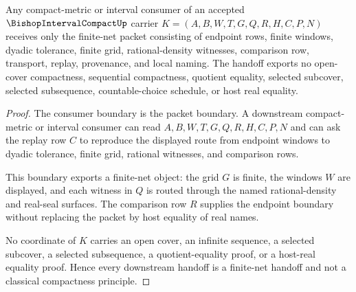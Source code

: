 \begin{theorem}
\label{thm:bishop-interval-compact-compact-metric-handoff}
Any compact-metric or interval consumer of an accepted $\BishopIntervalCompactUp$ carrier $K=(A,B,W,T,G,Q,R,H,C,P,N)$ receives only the finite-net packet consisting of endpoint rows, finite windows, dyadic tolerance, finite grid, rational-density witnesses, comparison row, transport, replay, provenance, and local naming. The handoff exports no open-cover compactness, sequential compactness, quotient equality, selected subcover, selected subsequence, countable-choice schedule, or host real equality.
\end{theorem}
\begin{proof}
The consumer boundary is the packet boundary. A downstream compact-metric or interval consumer can read $A,B,W,T,G,Q,R,H,C,P,N$ and can ask the replay row $C$ to reproduce the displayed route from endpoint windows to dyadic tolerance, finite grid, rational witnesses, and comparison rows.

This boundary exports a finite-net object: the grid $G$ is finite, the windows $W$ are displayed, and each witness in $Q$ is routed through the named rational-density and real-seal surfaces. The comparison row $R$ supplies the endpoint boundary without replacing the packet by host equality of real names.

No coordinate of $K$ carries an open cover, an infinite sequence, a selected subcover, a selected subsequence, a quotient-equality proof, or a host-real equality proof. Hence every downstream handoff is a finite-net handoff and not a classical compactness principle.
\end{proof}

\begin{closurestatus}{\BishopIntervalCompactUp}
  \theoryclosure{\seedClosure}
  \formalstatus{\unformalizedV}
\end{closurestatus}
